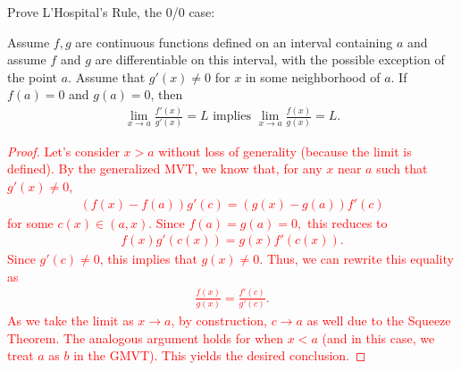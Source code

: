 \documentclass{ximera}
\begin{document}
\begin{exercise}
    Prove L'Hospital's Rule, the 0/0 case:
    \begin{theorem}
        Assume $f, g$ are continuous functions defined on an interval containing $a$ and assume $f$ and $g$ are differentiable on this interval, with the possible exception of the point $a$. Assume that $g'(x) \neq 0$ for $x$ in some neighborhood of $a$.  If $f(a) = 0$ and $g(a) = 0$, then
        \begin{align*}
            \lim\limits_{x\to a} \frac{f'(x)}{g'(x)} = L \text{ implies } \lim\limits_{x\to a} \frac{f(x)}{g(x)} = L.
         \end{align*}
    \end{theorem}
\end{exercise}
\textcolor{red}{
\begin{proof}
    Let's consider $x>a$ without loss of generality (because the limit is defined).  By the generalized MVT, we know that, for any $x$ near $a$ such that $g'(x) \neq 0$,
    \begin{align*}
        (f(x) - f(a))g'(c) = (g(x) - g(a))f'(c)
    \end{align*}
    for some $c(x) \in (a,x)$.  Since $f(a) = g(a) = 0,$ this reduces to
    \begin{align*}
        f(x)g'(c(x)) = g(x)f'(c(x)).
    \end{align*}
    Since $g'(c) \neq 0$, this implies that $g(x) \neq 0$.  Thus, we can rewrite this equality as
    \begin{align*}
        \frac{f(x)}{g(x)} = \frac{f'(c)}{g'(c)}.
    \end{align*}
    As we take the limit as $x \to a$, by construction, $c \to a$ as well due to the Squeeze Theorem.  The analogous argument holds for when $x< a$ (and in this case, we treat $a$ as $b$ in the GMVT).  This yields the desired conclusion.
\end{proof}
}
\end{document}
